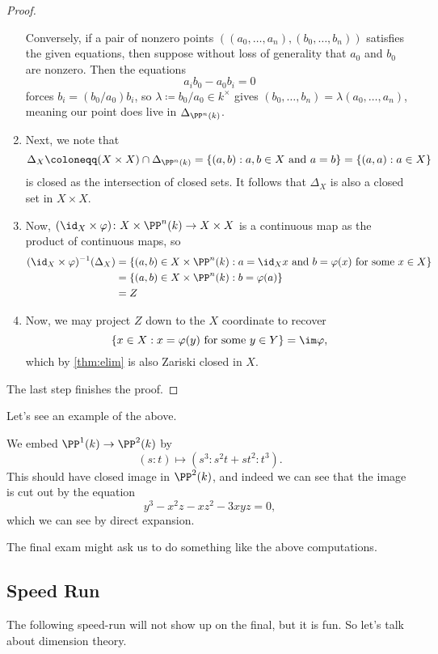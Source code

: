 \begin{proof}
\begin{enumerate}
		Conversely, if a pair of nonzero points $((a_0,\ldots,a_n),(b_0,\ldots,b_n))$ satisfies the given equations, then suppose without loss of generality that $a_0$ and $b_0$ are nonzero. Then the equations
		\[a_ib_0-a_0b_i=0\]
		forces $b_i=(b_0/a_0)b_i$, so $\lambda\coloneqq b_0/a_0\in k^\times$ gives $(b_0,\ldots,b_n)=\lambda(a_0,\ldots,a_n)$, meaning our point does live in $\Delta_{\PP^n(k)}$.
		\item Next, we note that
		\[\Delta_X\coloneqq(X\times X)\cap\Delta_{\PP^n(k)}=\{(a,b):a,b\in X\text{ and }a=b\}=\{(a,a):a\in X\}\]
		is closed as the intersection of closed sets. It follows that $\Delta_X$ is also a closed set in $X\times X$.
		\item Now, $(\id_X\times\varphi)\colon X\times\PP^n(k)\to X\times X$ is a continuous map as the product of continuous maps, so
		\begin{align*}
			(\id_X\times\varphi)^{-1}(\Delta_X) &= \{(a,b)\in X\times\PP^n(k):a=\id_Xx\text{ and }b=\varphi(x)\text{ for some }x\in X\} \\
			&= \{(a,b)\in X\times\PP^n(k):b=\varphi(a)\} \\
			&= Z
		\end{align*}
		\item Now, we may project $Z$ down to the $X$ coordinate to recover
		\[\{x\in X:x=\varphi(y)\text{ for some }y\in Y\}=\im\varphi,\]
		which by \autoref{thm:elim} is also Zariski closed in $X$.
	\end{enumerate}
	The last step finishes the proof.
\end{proof}
Let's see an example of the above.
\begin{ex}
	We embed $\PP^1(k)\to\PP^2(k)$ by
	\[(s:t)\mapsto\left(s^3:s^2t+st^2:t^3\right).\]
	This should have closed image in $\PP^2(k)$, and indeed we can see that the image is cut out by the equation
	\[y^3-x^2z-xz^2-3xyz=0,\]
	which we can see by direct expansion.
\end{ex}
\begin{remark}
	The final exam might ask us to do something like the above computations.
\end{remark}

\subsection{Speed Run}
The following speed-run will not show up on the final, but it is fun. So let's talk about dimension theory.


